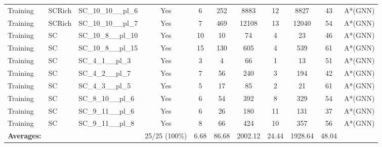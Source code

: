 \documentclass{article}
\begin{document}
\begin{tabular}{lllcccccccc}
Training & SCRich & SC\_10\_10\_\_pl\_6 & Yes & 6 & 252 & 8883 & 12 & 8827 & 43 & A*(GNN) \\
Training & SCRich & SC\_10\_10\_\_pl\_7 & Yes & 7 & 469 & 12108 & 13 & 12040 & 54 & A*(GNN) \\
Training & SC & SC\_10\_8\_\_pl\_10 & Yes & 10 & 10 & 74 & 4 & 23 & 46 & A*(GNN) \\
Training & SC & SC\_10\_8\_\_pl\_15 & Yes & 15 & 130 & 605 & 4 & 539 & 61 & A*(GNN) \\
Training & SC & SC\_4\_1\_\_pl\_3 & Yes & 3 & 4 & 66 & 1 & 13 & 51 & A*(GNN) \\
Training & SC & SC\_4\_2\_\_pl\_7 & Yes & 7 & 56 & 240 & 3 & 194 & 42 & A*(GNN) \\
Training & SC & SC\_4\_3\_\_pl\_5 & Yes & 5 & 17 & 85 & 2 & 21 & 61 & A*(GNN) \\
Training & SC & SC\_8\_10\_\_pl\_6 & Yes & 6 & 54 & 392 & 8 & 329 & 54 & A*(GNN) \\
Training & SC & SC\_9\_11\_\_pl\_6 & Yes & 6 & 26 & 180 & 11 & 131 & 37 & A*(GNN) \\
Training & SC & SC\_9\_11\_\_pl\_8 & Yes & 8 & 66 & 424 & 10 & 357 & 56 & A*(GNN) \\
\textbf{Averages:} & & & 25/25 (100\%) & 6.68 & 86.68 & 2002.12 & 24.44 & 1928.64 & 48.04 & \\
\bottomrule
\end{tabular}
\newpage
\end{document}
